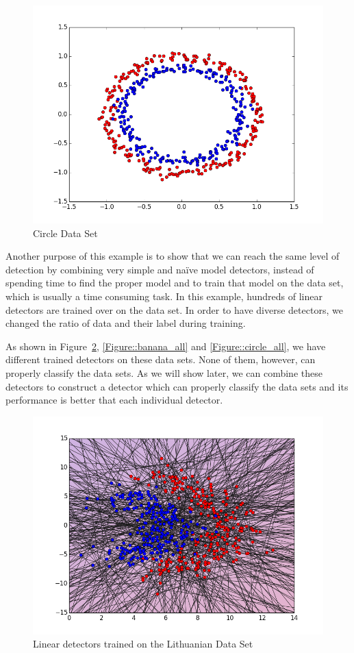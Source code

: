 \begin{figure}[]
\centering
\includegraphics[scale=0.6]{figs/dataset_circle}
\caption{Circle Data Set}
\label{Figure::circle}
\end{figure}

Another purpose of this example is to show that we can reach the same level of detection by combining very simple and naïve model detectors, instead of spending time to find the proper model and to train that model on the data set, which is usually a time consuming task. In this example, hundreds of linear detectors are trained over on the data set. In order to have diverse detectors, we changed the ratio of data and their label during training.

As shown in Figure~\ref{Figure::lithuanian_all}, \ref{Figure::banana_all} and \ref{Figure::circle_all}, we have different trained detectors on these data sets. None of them, however, can properly classify the data sets. As we will show later, we can combine these detectors to construct a detector which can properly classify the data sets and its performance is better that each individual detector.

\begin{figure}[H]
\centering
\includegraphics[scale=0.6]{figs/AllClassifiersLithuanian}
\caption{Linear detectors trained on the Lithuanian Data Set}
\label{Figure::lithuanian_all}
\end{figure}

